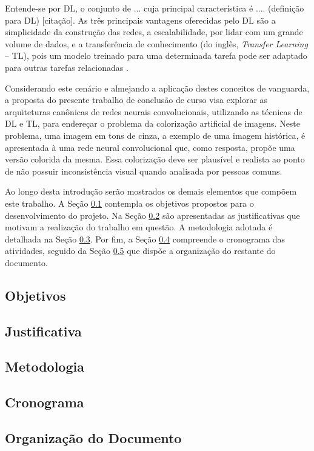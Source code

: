 Entende-se por DL, o conjunto de ... cuja principal característica é .... (definição para DL) [citação].  As três principais vantagens oferecidas pelo DL são a simplicidade da construção das redes, a escalabilidade, por lidar com um grande volume de dados, e a transferência de conhecimento (do inglês, \textit{Transfer Learning} -- TL), pois um modelo treinado para uma determinada tarefa pode ser adaptado para outras tarefas relacionadas \cite{ref:khan}.

Considerando este cenário e almejando a aplicação destes conceitos de vanguarda, a proposta do presente trabalho de conclusão de curso visa explorar as arquiteturas canônicas de redes neurais convolucionais, utilizando as técnicas de DL e TL, para endereçar o problema da colorização artificial de imagens. Neste problema, uma imagem em tons de cinza, a exemplo de uma imagem histórica, é apresentada à uma rede neural convolucional que, como resposta, propõe uma versão colorida da mesma. Essa colorização deve ser plausível e realista ao ponto de não possuir inconsistência visual quando analisada por pessoas comuns.

Ao longo desta introdução serão mostrados os demais elementos que compõem este trabalho. A Seção \ref{subsec:objetivos} contempla os objetivos propostos para o desenvolvimento do projeto. Na Seção \ref{subsec:jutificativa} são apresentadas as justificativas  que motivam a realização do trabalho em questão. A metodologia adotada é detalhada na Seção \ref{subsec:metodologia}. Por fim, a Seção \ref{subsec:cronograma}  compreende o cronograma das atividades, seguido da Seção \ref{subsec:organizacao} que dispõe a organização do restante do documento.

\subsection{Objetivos} \label{subsec:objetivos}


\subsection{Justificativa} \label{subsec:jutificativa}


\subsection{Metodologia} \label{subsec:metodologia}


\subsection{Cronograma} \label{subsec:cronograma}


\subsection{Organização do Documento} \label{subsec:organizacao}

